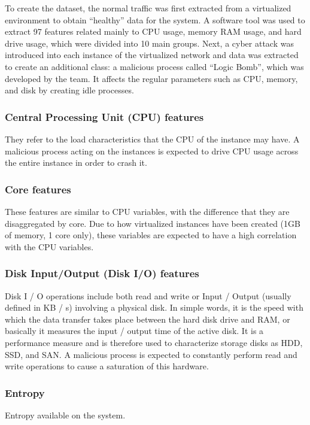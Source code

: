 \documentclass{iosart2c}
\begin{document}
To create the dataset, the normal traffic was first extracted from a virtualized environment to obtain ``healthy'' data for the system. A software tool was used to extract 97 features related mainly to CPU usage, memory RAM usage, and hard drive usage, which were divided into 10 main groups. Next, a cyber attack was introduced into each instance of the virtualized network and data was extracted to create an additional class: a malicious process called  ``Logic Bomb'', which was developed by the team. It affects the regular parameters such as CPU, memory, and disk by creating idle processes.

\subsubsection{Central Processing Unit (CPU) features}
They refer to the load characteristics that the CPU of the instance may have. A malicious process acting on the instances is expected to drive CPU usage across the entire instance in order to crash it.\\


\subsubsection{Core features}
These features are similar to CPU variables, with the difference that they are disaggregated by core. Due to how virtualized instances have been created (1GB of memory, 1 core only), these variables are expected to have a high correlation with the CPU variables.


\subsubsection{Disk Input/Output (Disk I/O) features}
Disk I / O operations include both read and write or Input / Output (usually defined in KB / s) involving a physical disk. In simple words, it is the speed with which the data transfer takes place between the hard disk drive and RAM, or basically it measures the input / output time of the active disk. It is a performance measure and is therefore used to characterize storage disks as HDD, SSD, and SAN. A malicious process is expected to constantly perform read and write operations to cause a saturation of this hardware.

\subsubsection{Entropy}
Entropy available on the system.
\end{document}
